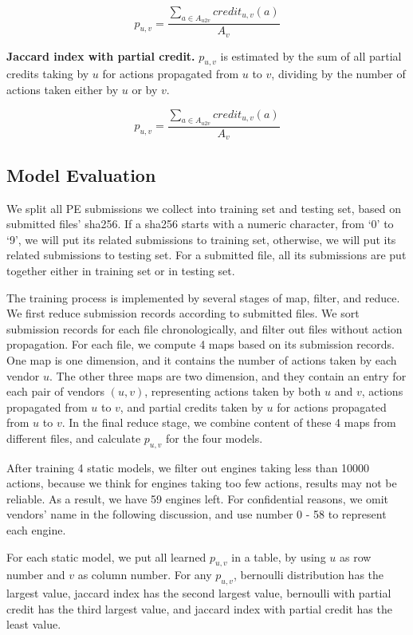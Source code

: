 $$p_{u,v} = \frac{\sum\limits_{a \in A_{u2v}}{credit_{u,v}(a)}}{A_v}$$

{\bf Jaccard index with partial credit.} 
$p_{u,v}$ is estimated by the sum of all partial credits taking by $u$ for actions propagated from $u$ to $v$, 
dividing by the number of actions taken either by $u$ or by $v$. 

$$p_{u,v} = \frac{\sum\limits_{a \in A_{u2v}}{credit_{u,v}(a)}}{A_v}$$




\subsection{Model Evaluation}
\label{sec:predict}

We split all PE submissions we collect into training set and testing set, based on submitted files’ sha256. 
If a sha256 starts with a numeric character, 
from ‘0’ to ‘9’, we will put its related submissions to training set, 
otherwise, we will put its related submissions to testing set.  
For a submitted file, all its submissions are put together either in training set or in testing set. 

The training process is implemented by several stages of map, filter, and reduce. 
We first reduce submission records according to submitted files. 
We sort submission records for each file chronologically, 
and filter out files without action propagation. 
For each file, we compute 4 maps based on its submission records. 
One map is one dimension, and it contains the number of actions taken by each vendor $u$. 
The other three maps are two dimension, and they contain an entry for each pair of vendors $(u,v)$, 
representing actions taken by both $u$ and $v$, actions propagated from $u$ to $v$, 
and partial credits taken by $u$ for actions propagated from $u$ to $v$. 
In the final reduce stage, 
we combine content of these 4 maps from different files, and calculate $p_{u,v}$ for the four models. 

After training 4 static models, we filter out engines taking less than 10000 actions,
because we think for engines taking too few actions, results may not be reliable. 
As a result, we have 59 engines left. 
For confidential reasons, we omit vendors’ name in the following discussion, 
and use number 0 - 58 to represent each engine. 

For each static model, 
we put all learned $p_{u,v}$ in a table, 
by using $u$ as row number and $v$ as column number.
For any $p_{u,v}$, bernoulli distribution has the largest value, 
jaccard index has the second largest value, 
bernoulli with partial credit has the third largest value,
and jaccard index with partial credit has the least value. 

